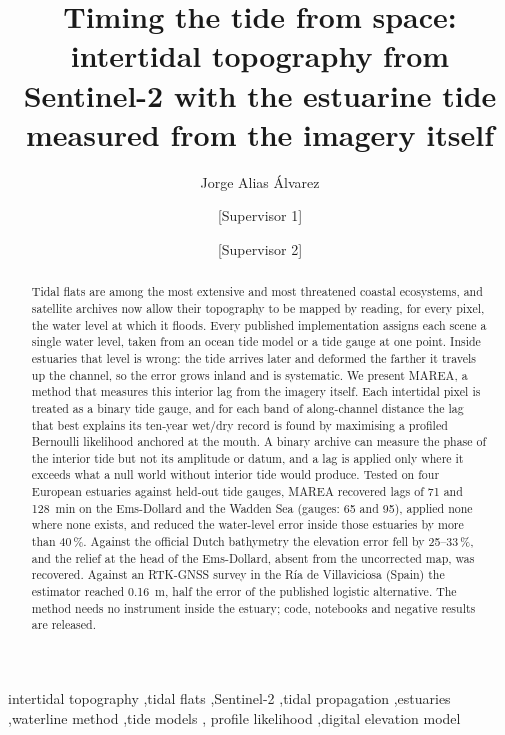 \documentclass[final,5p,times,number]{elsarticle}
\begin{document}
\begin{frontmatter}

\title{Timing the tide from space: intertidal topography from Sentinel-2
  with the estuarine tide measured from the imagery itself}

\author[a]{Jorge Alias \'Alvarez}
\author[b]{[Supervisor 1]}
\author[c]{[Supervisor 2]}

\begin{abstract}
Tidal flats are among the most extensive and most threatened coastal
ecosystems, and satellite archives now allow their topography to be mapped
by reading, for every pixel, the water level at which it floods. Every
published implementation assigns each scene a single water level, taken
from an ocean tide model or a tide gauge at one point. Inside estuaries
that level is wrong: the tide arrives later and deformed the farther it
travels up the channel, so the error grows inland and is systematic. We
present MAREA, a method that measures this interior lag from the imagery
itself. Each intertidal pixel is treated as a binary tide gauge, and for
each band of along-channel distance the lag that best explains its
ten-year wet/dry record is found by maximising a profiled Bernoulli
likelihood anchored at the mouth. A binary archive can measure the phase
of the interior tide but not its amplitude or datum, and a lag is applied
only where it exceeds what a null world without interior tide would
produce. Tested on four European estuaries against held-out tide gauges,
MAREA recovered lags of 71 and 128~min on the Ems-Dollard and the Wadden
Sea (gauges: 65 and 95), applied none where none exists, and reduced the
water-level error inside those estuaries by more than 40\,\%. Against the
official Dutch bathymetry the elevation error fell by 25--33\,\%, and the
relief at the head of the Ems-Dollard, absent from the uncorrected map, was
recovered. Against an RTK-GNSS survey in the R\'ia de Villaviciosa (Spain)
the estimator reached 0.16~m, half the error of the published logistic
alternative. The method needs no instrument inside the estuary; code,
notebooks and negative results are released.
\end{abstract}

\begin{keyword}
intertidal topography \sep tidal flats \sep Sentinel-2 \sep tidal
propagation \sep estuaries \sep waterline method \sep tide models \sep
profile likelihood \sep digital elevation model
\end{keyword}

\end{frontmatter}
\end{document}
